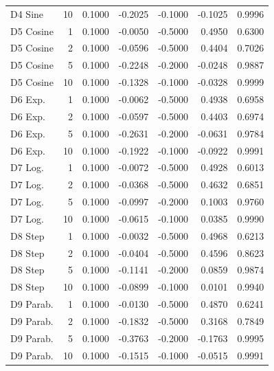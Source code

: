 \begin{tabular}{lrrrrrr}
     D4 Sine &   10 & 0.1000 &    -0.2025 &       -0.1000 &     -0.1025 & 0.9996 \\
   D5 Cosine &    1 & 0.1000 &    -0.0050 &       -0.5000 &      0.4950 & 0.6300 \\
   D5 Cosine &    2 & 0.1000 &    -0.0596 &       -0.5000 &      0.4404 & 0.7026 \\
   D5 Cosine &    5 & 0.1000 &    -0.2248 &       -0.2000 &     -0.0248 & 0.9887 \\
   D5 Cosine &   10 & 0.1000 &    -0.1328 &       -0.1000 &     -0.0328 & 0.9999 \\
     D6 Exp. &    1 & 0.1000 &    -0.0062 &       -0.5000 &      0.4938 & 0.6958 \\
     D6 Exp. &    2 & 0.1000 &    -0.0597 &       -0.5000 &      0.4403 & 0.6974 \\
     D6 Exp. &    5 & 0.1000 &    -0.2631 &       -0.2000 &     -0.0631 & 0.9784 \\
     D6 Exp. &   10 & 0.1000 &    -0.1922 &       -0.1000 &     -0.0922 & 0.9991 \\
     D7 Log. &    1 & 0.1000 &    -0.0072 &       -0.5000 &      0.4928 & 0.6013 \\
     D7 Log. &    2 & 0.1000 &    -0.0368 &       -0.5000 &      0.4632 & 0.6851 \\
     D7 Log. &    5 & 0.1000 &    -0.0997 &       -0.2000 &      0.1003 & 0.9760 \\
     D7 Log. &   10 & 0.1000 &    -0.0615 &       -0.1000 &      0.0385 & 0.9990 \\
     D8 Step &    1 & 0.1000 &    -0.0032 &       -0.5000 &      0.4968 & 0.6213 \\
     D8 Step &    2 & 0.1000 &    -0.0404 &       -0.5000 &      0.4596 & 0.8623 \\
     D8 Step &    5 & 0.1000 &    -0.1141 &       -0.2000 &      0.0859 & 0.9874 \\
     D8 Step &   10 & 0.1000 &    -0.0899 &       -0.1000 &      0.0101 & 0.9940 \\
   D9 Parab. &    1 & 0.1000 &    -0.0130 &       -0.5000 &      0.4870 & 0.6241 \\
   D9 Parab. &    2 & 0.1000 &    -0.1832 &       -0.5000 &      0.3168 & 0.7849 \\
   D9 Parab. &    5 & 0.1000 &    -0.3763 &       -0.2000 &     -0.1763 & 0.9995 \\
   D9 Parab. &   10 & 0.1000 &    -0.1515 &       -0.1000 &     -0.0515 & 0.9991 \\

\end{tabular}
